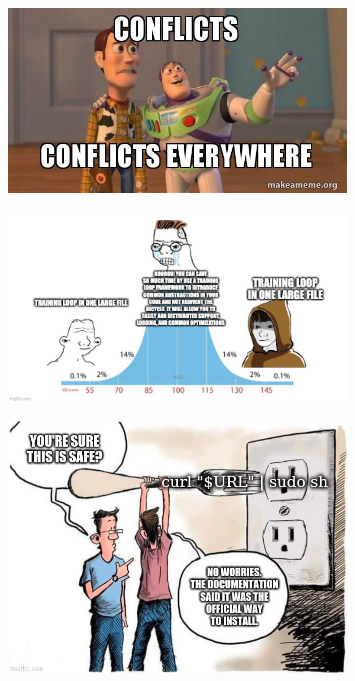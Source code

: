 \documentclass[a4paper]{article}
\begin{document}
\begin{figure}[htbp]
\centering
\includegraphics[width=0.8\textwidth]{meme-conflicts.jpg}

\label{fig:meme-conflicts}
\end{figure}

\begin{figure}[htbp]
\centering
\includegraphics[width=0.8\textwidth]{meme-training-loop.jpg}

\label{fig:meme-training-loop}
\end{figure}

\begin{figure}[htbp]
\centering
\includegraphics[width=0.8\textwidth]{meme-fork.jpg}

\label{fig:meme-fork}
\end{figure}
\end{document}
